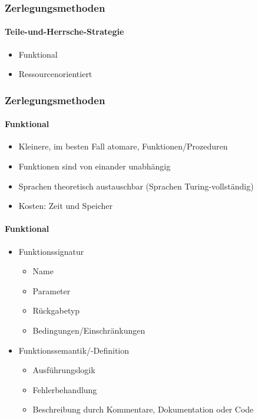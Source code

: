\begin{frame}
  \frametitle{Zerlegungsmethoden}
  \framesubtitle{Teile-und-Herrsche-Strategie}
  \begin{itemize}
    \item Funktional
    \item Ressourcenorientiert
  \end{itemize}
\end{frame}

\begin{frame}
  \frametitle{Zerlegungsmethoden}
  \framesubtitle{Funktional}
  \begin{itemize}
    \item Kleinere, im besten Fall atomare, Funktionen/Prozeduren
    \item Funktionen sind von einander unabhängig
    \item Sprachen theoretisch austauschbar (Sprachen Turing-vollständig)
    \item Kosten: Zeit und Speicher
  \end{itemize} 
\end{frame}

\begin{frame}
  \framesubtitle{Funktional}
  \begin{itemize}
    \item Funktionssignatur
    \begin{itemize}
      \item Name
      \item Parameter
      \item Rückgabetyp
      \item Bedingungen/Einschränkungen
     \end{itemize} 
    \item Funktionssemantik/-Definition
    \begin{itemize}
      \item Ausführungslogik
      \item Fehlerbehandlung
      \item Beschreibung durch Kommentare, Dokumentation oder Code
    \end{itemize} 
  \end{itemize} 
\end{frame}

